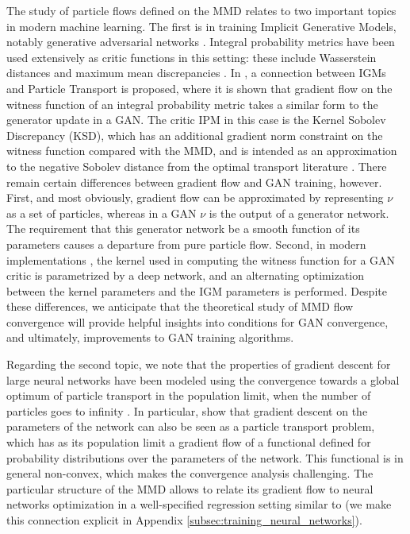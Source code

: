The study of particle flows defined on the MMD relates to two important topics in modern machine learning. The first is in training Implicit Generative Models, notably generative adversarial networks \cite{gans}.  Integral probability metrics have been used extensively as critic functions in this setting: these include Wasserstein distances \cite{towards-principled-gans,wgan-gp,sinkhorn-igm} and maximum mean discrepancies \cite{gen-mmd,Li:2015,Li:2017a,cramer-gan,Binkowski:2018,Arbel:2018}.  In \cite[Section 3.3]{Mroueh:2019}, a connection between IGMs and Particle Transport is proposed, where it is shown that gradient flow on the witness function of an integral probability metric takes a similar form to the generator update in a GAN. The critic IPM in this case is the Kernel Sobolev Discrepancy (KSD), which has an additional gradient norm constraint on the witness function compared with the MMD, and is intended as an approximation to the negative Sobolev distance from the optimal transport literature \cite{Otto:2000,Villani:2009,Peyre:2011}.  There remain certain differences between gradient flow and GAN training, however.  First, and most obviously, gradient flow can be approximated by representing $\nu$ as a set of particles, whereas in a GAN $\nu$ is the output of a generator network. The requirement that this generator network be a smooth function of its parameters causes a departure from pure particle flow. Second, in modern implementations \cite{Li:2017a,Binkowski:2018,Arbel:2018}, the kernel used in computing the witness function for a GAN critic is parametrized by a deep network, and an alternating optimization between the kernel parameters and the IGM parameters is performed. Despite these differences, we anticipate that the theoretical study of MMD flow convergence will provide helpful insights into conditions for GAN convergence, and ultimately, improvements to GAN training algorithms.

Regarding the second topic, we note that the properties of gradient descent for large neural networks
have been modeled using the convergence towards a global optimum of particle transport in the population limit, when the number of particles goes to infinity  \cite{rotskoff2018neural,chizat2018global,mei2018mean,sirignano2018mean}. 
In particular, \cite{rotskoff2019global} show that gradient descent on the parameters of the network can also be seen as a particle transport problem, which has as its population limit a gradient flow of a  functional defined for probability distributions over the parameters of the network. 
This functional is in general non-convex, which makes the convergence analysis challenging.
The particular structure of the MMD allows to relate its gradient flow to neural networks optimization in a well-specified regression setting similar to \cite{rotskoff2019global} (we make this connection explicit in Appendix \ref{subsec:training_neural_networks}).

